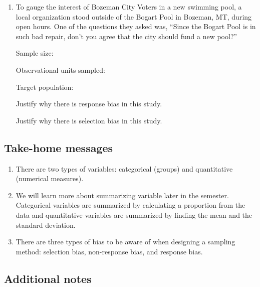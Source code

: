 \documentclass[
]{report}
\begin{document}
\newpage

\begin{enumerate}
\def\labelenumi{\arabic{enumi}.}
\setcounter{enumi}{6}
\item
  To gauge the interest of Bozeman City Voters in a new swimming pool, a local organization stood outside of the Bogart Pool in Bozeman, MT, during open hours. One of the questions they asked was, ``Since the Bogart Pool is in such bad repair, don't you agree that the city should fund a new pool?''
  \vspace{0.1in}

  Sample size:
  \vspace{0.3in}

  Observational units sampled:
  \vspace{0.3in}

  Target population:
  \vspace{0.3in}

  Justify why there is response bias in this study.
  \vspace{0.5in}

  Justify why there is selection bias in this study.
  \vspace{0.5in}
\end{enumerate}

\subsection{Take-home messages}\label{take-home-messages}

\begin{enumerate}
\def\labelenumi{\arabic{enumi}.}
\item
  There are two types of variables: categorical (groups) and quantitative (numerical measures).
\item
  We will learn more about summarizing variable later in the semester. Categorical variables are summarized by calculating a proportion from the data and quantitative variables are summarized by finding the mean and the standard deviation.
\item
  There are three types of bias to be aware of when designing a sampling method: selection bias, non-response bias, and response bias.
\end{enumerate}

\subsection{Additional notes}\label{additional-notes}
\end{document}
